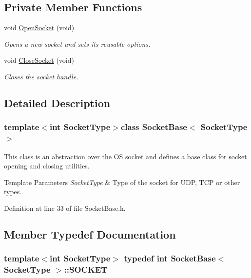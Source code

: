 \subsection*{Private Member Functions}
\begin{DoxyCompactItemize}
\item 
void \hyperlink{class_socket_base_a812f91e92f493eeb546395b41c5ad465}{Open\-Socket} (void)
\begin{DoxyCompactList}\small\item\em Opens a new socket and sets its reusable options. \end{DoxyCompactList}\item 
void \hyperlink{class_socket_base_accdcf166761d3a7f7dc9bfb4afd939e1}{Close\-Socket} (void)
\begin{DoxyCompactList}\small\item\em Closes the socket handle. \end{DoxyCompactList}\end{DoxyCompactItemize}


\subsection{Detailed Description}
\subsubsection*{template$<$int Socket\-Type$>$class Socket\-Base$<$ Socket\-Type $>$}

This class is an abstraction over the O\-S socket and defines a base class for socket opening and closing utilities. 


\begin{DoxyTemplParams}{Template Parameters}
{\em Socket\-Type} & Type of the socket for U\-D\-P, T\-C\-P or other types. \\
\hline
\end{DoxyTemplParams}


Definition at line 33 of file Socket\-Base.\-h.



\subsection{Member Typedef Documentation}
\hypertarget{class_socket_base_aa1bd9ff0bcf59292806575e0abbe3829}{
\subsubsection[{S\-O\-C\-K\-E\-T}]{\setlength{\rightskip}{0pt plus 5cm}template$<$int Socket\-Type$>$ typedef int {\bf Socket\-Base}$<$ Socket\-Type $>$\-::{\bf S\-O\-C\-K\-E\-T}\hspace{0.3cm}{\ttfamily [protected]}}}\label{class_socket_base_aa1bd9ff0bcf59292806575e0abbe3829}


